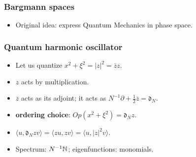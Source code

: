 \documentclass[mathserif]{beamer}
\begin{document}
\begin{frame}
  \frametitle{Bargmann spaces}
  \begin{itemize}
  \item Original idea: express Quantum Mechanics {\color{myorange} in phase
    space}.
  \end{itemize}

\end{frame}

\begin{frame}
  \frametitle{Quantum harmonic oscillator}
  \begin{itemize}
  \item Let us quantize $x^2+\xi^2=|z|^2=\overline{z}z$.
  \item<2-> $z$ acts by multiplication.
  \item<3-> $\overline{z}$ acts as its adjoint; it acts as
    $N^{-1}\partial+\frac 12 \overline{z}=\mathfrak{d}_N$.
  \item<4-> {\bf ordering choice}: $Op(x^2+\xi^2)=\mathfrak{d}_Nz$.
  \item<5-> $\langle u,\mathfrak{d}_Nzv\rangle=\langle
    zu,zv\rangle=\langle u,|z|^2v\rangle$.
  \item<6> Spectrum: $N^{-1}\mathbb{N}$; eigenfunctions: monomials. \vspace{1em}
  \end{itemize}
\end{frame}
\end{document}
